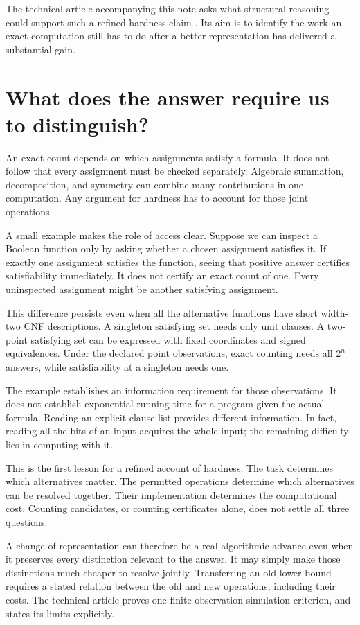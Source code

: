 \documentclass[11pt,letterpaper]{article}
\begin{document}
The technical article accompanying this note asks what structural
reasoning could support such a refined hardness claim \citep{Main26}.
Its aim is to identify the work an exact computation still has to do
after a better representation has delivered a substantial gain.

\section{What does the answer require us to
distinguish?}\label{what-does-the-answer-require-us-to-distinguish}

An exact count depends on which assignments satisfy a formula. It does
not follow that every assignment must be checked separately. Algebraic
summation, decomposition, and symmetry can combine many contributions in
one computation. Any argument for hardness has to account for those
joint operations.

A small example makes the role of access clear. Suppose we can inspect a
Boolean function only by asking whether a chosen assignment satisfies
it. If exactly one assignment satisfies the function, seeing that
positive answer certifies satisfiability immediately. It does not
certify an exact count of one. Every uninspected assignment might be
another satisfying assignment.

This difference persists even when all the alternative functions have
short width-two CNF descriptions. A singleton satisfying set needs only
unit clauses. A two-point satisfying set can be expressed with fixed
coordinates and signed equivalences. Under the declared point
observations, exact counting needs all \(2^n\) answers, while
satisfiability at a singleton needs one.

The example establishes an information requirement for those
observations. It does not establish exponential running time for a
program given the actual formula. Reading an explicit clause list
provides different information. In fact, reading all the bits of an
input acquires the whole input; the remaining difficulty lies in
computing with it.

This is the first lesson for a refined account of hardness. The task
determines which alternatives matter. The permitted operations determine
which alternatives can be resolved together. Their implementation
determines the computational cost. Counting candidates, or counting
certificates alone, does not settle all three questions.

A change of representation can therefore be a real algorithmic advance
even when it preserves every distinction relevant to the answer. It may
simply make those distinctions much cheaper to resolve jointly.
Transferring an old lower bound requires a stated relation between the
old and new operations, including their costs. The technical article
proves one finite observation-simulation criterion, and states its
limits explicitly.
\end{document}

